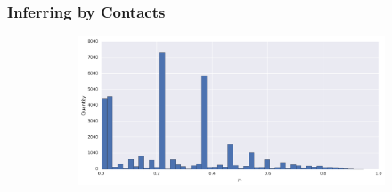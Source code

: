 \subsubsection{Inferring by Contacts}

\begin{figure}[h]
\centering
\begin{subfigure}[t]{\textwidth}
	\includegraphics[width=\textwidth]{figures/bayes/hist_contacts.png}
\end{subfigure}


\end{figure}
